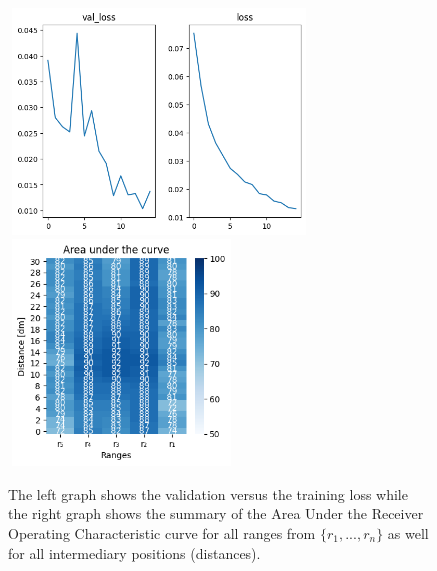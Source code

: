 \begin{multicols}{2}
\begin{itemize}
\end{itemize}
\end{multicols}\begin{figure}[H]%
\centering
\includegraphics[width=8cm,height=6cm]{3_models/models_28/graph_28.png}
\hspace{0.2 cm}
\includegraphics[width=6cm,height=6cm]{4_plots/plots_28/AUC_28.png}
\caption{The left graph shows the validation versus the training loss while the right graph shows the summary of the Area Under the Receiver Operating Characteristic curve for all ranges from $\{r_{1}, ... ,r_{n}\}$ as well for all intermediary positions (distances).}
\label{auc_28}
\end{figure}




